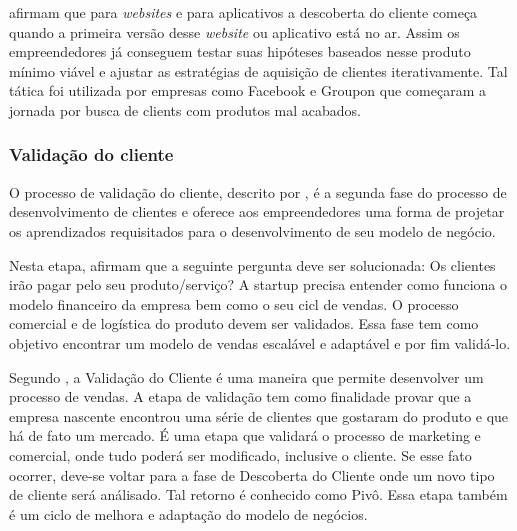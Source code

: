  afirmam que para \textit{websites} e para aplicativos a descoberta do cliente começa quando a primeira versão desse \textit{website} ou aplicativo está no ar. Assim os empreendedores já conseguem testar suas hipóteses baseados nesse produto mínimo viável e ajustar as estratégias de aquisição de clientes iterativamente. Tal tática foi utilizada por empresas como Facebook e Groupon que começaram a jornada por busca de clients com produtos mal acabados.

\subsubsection{Validação do cliente}
\label{cha:validacao_do_cliente}
O processo de validação do cliente, descrito por , é a segunda fase do processo de desenvolvimento de clientes e oferece aos empreendedores uma forma de projetar os aprendizados requisitados para o desenvolvimento de seu modelo de negócio. 

Nesta etapa,  afirmam que a seguinte pergunta deve ser solucionada: Os clientes irão pagar pelo seu produto/serviço? A startup precisa entender como funciona o modelo financeiro da empresa bem como o seu cicl de vendas. O processo comercial e de logística do produto devem ser validados. Essa fase tem como objetivo encontrar um modelo de vendas escalável e adaptável e por fim validá-lo. 

Segundo , a Validação do Cliente é uma maneira que permite desenvolver um processo de vendas. A etapa de validação tem como finalidade provar que a empresa nascente encontrou uma série de clientes que gostaram do produto e que há de fato um mercado. É uma etapa que validará o processo de marketing e comercial, onde tudo poderá ser modificado, inclusive o cliente. Se esse fato ocorrer, deve-se voltar para a fase de Descoberta do Cliente onde um novo tipo de cliente será análisado. Tal retorno é conhecido como Pivô. Essa etapa também é um ciclo de melhora e adaptação do modelo de negócios.

